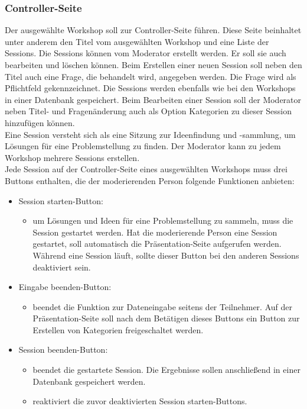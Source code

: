 \subsubsection*{Controller-Seite}
Der ausgewählte Workshop soll zur Controller-Seite führen. Diese Seite beinhaltet unter anderem den Titel vom ausgewählten Workshop und eine Liste der Sessions. Die Sessions können vom Moderator erstellt werden. Er soll sie auch bearbeiten und löschen können. Beim Erstellen einer neuen Session soll neben den Titel auch eine Frage, die behandelt wird, angegeben werden. Die Frage wird als Pflichtfeld gekennzeichnet. Die Sessions werden ebenfalls wie bei den Workshops in einer Datenbank gespeichert. Beim Bearbeiten einer Session soll der Moderator neben Titel- und Fragenänderung auch als Option Kategorien zu dieser Session hinzufügen können.
\\ 

Eine Session versteht sich als eine Sitzung zur Ideenfindung und -sammlung, um Lösungen für eine Problemstellung zu finden. Der Moderator kann zu jedem Workshop mehrere Sessions erstellen.
\\

Jede Session auf der Controller-Seite eines ausgewählten Workshops muss drei Buttons enthalten, die der moderierenden Person folgende Funktionen anbieten:
\begin{itemize}
\item Session starten-Button:
\begin{itemize}
\item um Lösungen und Ideen für eine Problemstellung zu sammeln, muss die Session gestartet werden. Hat die moderierende Person eine Session gestartet, soll automatisch die Präsentation-Seite aufgerufen werden. Während eine Session läuft, sollte dieser Button bei den anderen Sessions deaktiviert sein.
\end{itemize}
\item Eingabe beenden-Button:
\begin{itemize}
\item beendet die Funktion zur Dateneingabe seitens der Teilnehmer. Auf der Präsentation-Seite soll nach dem Betätigen dieses Buttons ein Button zur Erstellen von Kategorien freigeschaltet werden.
\end{itemize}
\item Session beenden-Button:
\begin{itemize}
\item beendet die gestartete Session. Die Ergebnisse sollen anschließend in einer Datenbank gespeichert werden.
\item reaktiviert die zuvor deaktivierten Session starten-Buttons.
\end{itemize}
\end{itemize}

